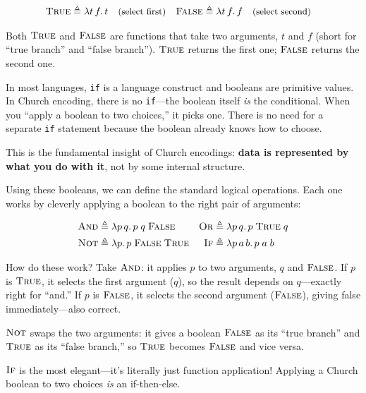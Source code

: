\documentclass[11pt,a4paper]{article}
\theoremstyle{definition}
\newcommand{\lam}{\lambda}
\newcommand{\TR}{\textsc{True}}
\newcommand{\FL}{\textsc{False}}
\newcommand{\rmark}[1]{\quad\text{\small(#1)}}
\begin{document}
\begin{defnbox}
\vspace{-0.8em}
\begin{align*}
\TR   &\triangleq \lam t\, f.\, t \rmark{select first} &
\FL  &\triangleq \lam t\, f.\, f \rmark{select second}
\end{align*}
\end{defnbox}

Both $\TR$ and $\FL$ are functions that take two arguments, $t$ and $f$
(short for ``true branch'' and ``false branch''). $\TR$ returns the first one;
$\FL$ returns the second one.

\begin{intuition}
In most languages, \texttt{if} is a language construct and booleans are
primitive values. In Church encoding, there is no \texttt{if}---the boolean
itself \emph{is} the conditional. When you ``apply a boolean to two choices,''
it picks one. There is no need for a separate \texttt{if} statement because
the boolean already knows how to choose.

This is the fundamental insight of Church encodings: \textbf{data is
represented by what you do with it}, not by some internal structure.
\end{intuition}

Using these booleans, we can define the standard logical operations. Each one
works by cleverly applying a boolean to the right pair of arguments:

\vspace{-0.5em}
\begin{align*}
\textsc{And}  &\triangleq \lam p\, q.\, p\; q\; \FL &
\textsc{Or}   &\triangleq \lam p\, q.\, p\; \TR\; q \\
\textsc{Not}  &\triangleq \lam p.\, p\; \FL\; \TR &
\textsc{If}   &\triangleq \lam p\, a\, b.\, p\; a\; b
\end{align*}

How do these work? Take $\textsc{And}$: it applies $p$ to two arguments, $q$
and $\FL$. If $p$ is $\TR$, it selects the first argument ($q$), so the result
depends on $q$---exactly right for ``and.'' If $p$ is $\FL$, it selects the
second argument ($\FL$), giving false immediately---also correct.

$\textsc{Not}$ swaps the two arguments: it gives a boolean $\FL$ as its ``true
branch'' and $\TR$ as its ``false branch,'' so $\TR$ becomes $\FL$ and vice
versa.

$\textsc{If}$ is the most elegant---it's literally just function application!
Applying a Church boolean to two choices \emph{is} an if-then-else.
\end{document}

